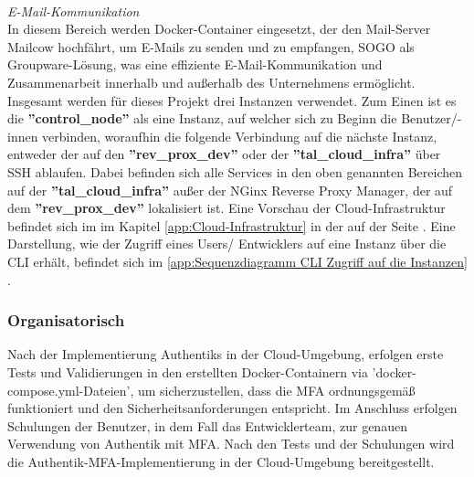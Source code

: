 \\\textit{E-Mail-Kommunikation}
\\In diesem Bereich werden Docker-Container eingesetzt, der den Mail-Server Mailcow hochfährt, um E-Mails zu senden und 
zu empfangen, SOGO als Groupware-Lösung, was eine effiziente E-Mail-Kommunikation und Zusammenarbeit innerhalb und außerhalb des 
Unternehmens ermöglicht.
Insgesamt werden für dieses Projekt drei Instanzen verwendet. Zum Einen ist es die \textbf{''control\_node''} 
als eine Instanz, auf welcher sich zu Beginn die Benutzer/-innen verbinden, woraufhin die folgende Verbindung auf die nächste Instanz, 
entweder der auf den \textbf{''rev\_prox\_dev''} oder der \textbf{''tal\_cloud\_infra''} über SSH ablaufen. Dabei befinden 
sich alle Services in den oben genannten Bereichen auf der \textbf{''tal\_cloud\_infra''} außer 
der NGinx Reverse Proxy Manager, der auf dem \textbf{''rev\_prox\_dev''} lokalisiert ist. Eine Vorschau der Cloud-Infrastruktur befindet 
sich im  im Kapitel \ref{app:Cloud-Infrastruktur} in der  auf der Seite 
\pageref{app:Cloud-Infrastruktur}. Eine Darstellung, wie der Zugriff eines Users/ Entwicklers auf eine Instanz über die \acs{CLI} erhält, 
befindet sich im  \ref*{app:Sequenzdiagramm CLI Zugriff auf die Instanzen} .

\subsubsection{Organisatorisch}
\label{sec:Organisatorisch}
Nach der Implementierung Authentiks in der Cloud-Umgebung, erfolgen erste Tests und Validierungen in den erstellten 
Docker-Containern via 'docker-compose.yml-Dateien', um sicherzustellen, dass die \acs{MFA} ordnungsgemäß funktioniert und den 
Sicherheitsanforderungen entspricht. 
Im Anschluss erfolgen Schulungen der Benutzer, in dem Fall das Entwicklerteam, zur genauen Verwendung von Authentik mit MFA. 
Nach den Tests und der Schulungen wird die Authentik-\acs{MFA}-Implementierung in der Cloud-Umgebung bereitgestellt.

